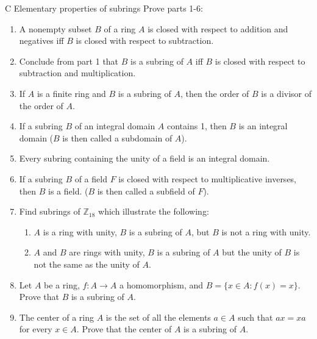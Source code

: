 \begin{exercise}{C Elementary properties of subrings}
  Prove parts 1-6:
    \begin{enumerate}
        \item A nonempty subset $B$ of a ring $A$ is closed with respect to addition and negatives iff $B$ is closed with respect to subtraction.
        \item Conclude from part 1 that $B$ is a subring of $A$ iff $B$ is closed with respect to subtraction and multiplication.
        \item If $A$ is a finite ring and $B$ is a subring of $A$, then the order of $B$ is a divisor of the order of $A$.
        \item If a subring $B$ of an integral domain $A$ contains 1, then $B$ is an integral domain ($B$ is then called a subdomain of $A$).
        \item Every subring containing the unity of a field is an integral domain.
        \item If a subring $B$ of a field $F$ is closed with respect to multiplicative inverses, then $B$ is a field. ($B$ is then called a subfield of $F$).
        \item Find subrings of $\mathbb{Z}_{18}$ which illustrate the following:
        \begin{enumerate}
            \item $A$ is a ring with unity, $B$ is a subring of $A$, but $B$ is not a ring with unity.
            \item $A$ and $B$ are rings with unity, $B$ is a subring of $A$ but the unity of $B$ is not the same as the unity of $A$.
        \end{enumerate}
        \item Let $A$ be a ring, $f:A\rightarrow A$ a homomorphism, and $B=\{x\in A: f(x)=x\}$. Prove that $B$ is a subring of $A$.
        \item The center of a ring $A$ is the set of all the elements $a\in A$ such that $ax=xa$ for every $x\in A$. Prove that the center of $A$ is a subring of $A$.
    \end{enumerate}
\end{exercise}
